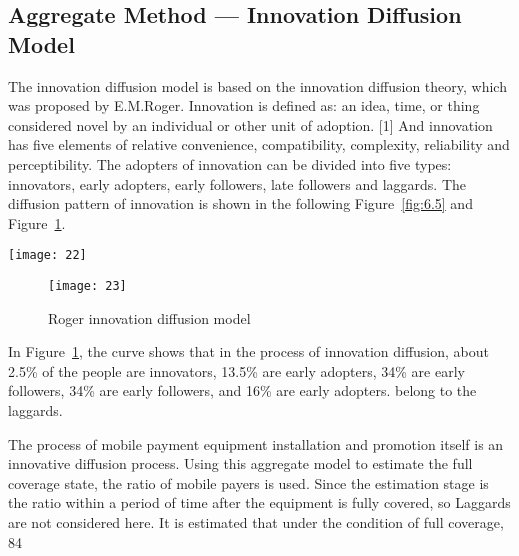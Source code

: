 \documentclass[../mcmpaper]{subfiles}
\begin{document}
\subsection{Aggregate Method --- Innovation Diffusion Model}
The innovation diffusion model is based on the innovation diffusion theory, which was proposed by E.M.Roger. Innovation is defined as: an idea, time, or thing considered novel by an individual or other unit of adoption. [1] And innovation has five elements of relative convenience, compatibility, complexity, reliability and perceptibility. The adopters of innovation can be divided into five types: innovators, early adopters, early followers, late followers and laggards. The diffusion pattern of innovation is shown in the following Figure~\ref{fig:6.5} and Figure~\ref{fig:6.6}.\\
\begin{minipage}[c]{\linewidth}
    \centering
    \texttt{[image: 22]}
    \label{fig:6.5}
\end{minipage}
\par
\begin{figure}[!ht] 
\begin{minipage}[c]{\linewidth}
    \centering
    \texttt{[image: 23]}
    \caption{Roger innovation diffusion model}
     \label{fig:6.6}
\end{minipage}
\end{figure}
\par
In Figure~\ref{fig:6.6}, the curve shows that in the process of innovation diffusion, about 2.5\% of the people are innovators, 13.5\% are early adopters, 34\% are early followers, 34\% are early followers, and 16\% are early adopters. belong to the laggards.
\par
The process of mobile payment equipment installation and promotion itself is an innovative diffusion process. Using this aggregate model to estimate the full coverage state, the ratio of mobile payers is used. Since the estimation stage is the ratio within a period of time after the equipment is fully covered, so Laggards are not considered here. It is estimated that under the condition of full coverage, 84%
\end{document}
